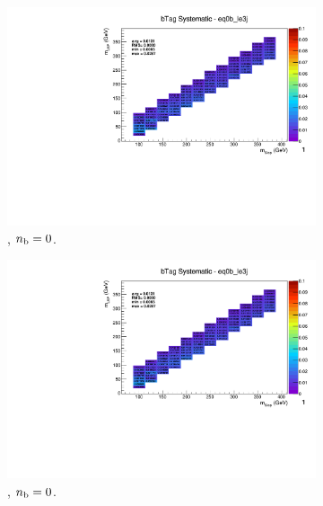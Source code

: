 \begin{figure}[ht!]
  \centering
  \begin{subfigure}[b]{0.32\textwidth}
    \includegraphics[width=\textwidth, page=12]{Figs/sms/t2degen/v19/systs/T2_4body_bTag_eq0b_le3j.pdf}
    \caption{\njlow, $n_{\text{b}} = 0$.}
  \end{subfigure}
  \begin{subfigure}[b]{0.32\textwidth}
    \includegraphics[width=\textwidth, page=8]{Figs/sms/t2degen/v19/systs/T2_4body_bTag_eq0b_le3j.pdf}
    \caption{\njlow, $n_{\text{b}} = 0$.}
  \end{subfigure}
  \begin{subfigure}[b]{0.32\textwidth}

\end{subfigure}
\end{figure}
